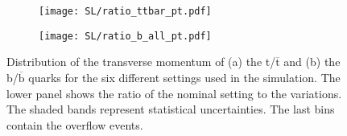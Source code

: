 \begin{figure}[H]
    \centering
    \begin{subfigure}{0.49\textwidth}
        \centering
        \texttt{[image: SL/ratio\_ttbar\_pt.pdf]}
        \caption{}
        \label{subfig:pt(t,tbar)_SL}        
    \end{subfigure}
    \hfill
    \begin{subfigure}{0.49\linewidth}
        \centering
        \texttt{[image: SL/ratio\_b\_all\_pt.pdf]}
        \caption{}
        \label{subfig:pt(b_all)_SL}
    \end{subfigure}
    \caption{Distribution of the transverse momentum of (a) the t/$\overline{\text{t}}$ and (b) the b/$\overline{\text{b}}$ quarks for the six different settings used in the simulation. The lower panel shows the ratio of the nominal setting to the variations. The shaded bands represent statistical uncertainties. The last bins contain the overflow events.}
    \label{fig:pt_SL}
\end{figure}




